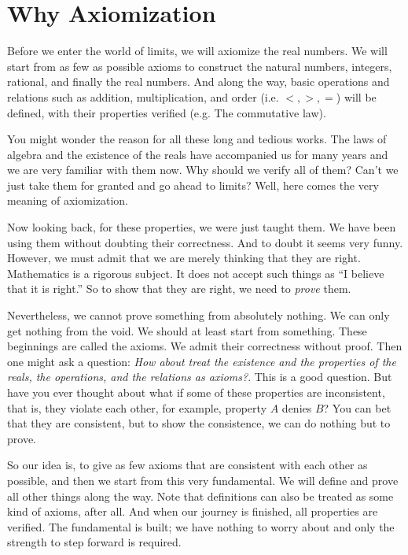 \part*{Why Axiomization}
Before we enter the world of limits, we will axiomize the real numbers. We will start from as few as possible  
axioms to construct the natural numbers, integers, rational, and finally the real numbers. And along the way, 
basic operations and relations such as addition, multiplication, and order (i.e. $<,>,=$) will be defined, with 
their properties verified (e.g. The commutative law).

You might wonder the reason for all these long and tedious works. The laws of algebra and the existence of the 
reals have accompanied us for many years and we are very familiar with them now. Why should we verify all of 
them? Can't we just take them for granted and go ahead to limits? Well, here comes the very meaning of 
axiomization.

Now looking back, for these properties, we were just taught them. We have been using them without doubting their 
correctness. And to doubt it seems very funny. However, we must admit that we are merely thinking that they are 
right. Mathematics is a rigorous subject. It does not accept such things as ``I believe that it is right.'' So to 
show that they are right, we need to \emph{prove} them.

Nevertheless, we cannot prove something from absolutely nothing. We can only get nothing from the void. We should 
at least start from something. These beginnings are called the axioms. We admit their correctness without proof. 
Then one might ask a question: \emph{How about treat the existence and the properties of the reals, the 
operations, and the relations as axioms?}. This is a good question. But have you ever thought about what if some 
of these properties are inconsistent, that is, they violate each other, for example, property $A$ denies $B$? You 
can bet that they are consistent, but to show the consistence, we can do nothing but to prove.

So our idea is, to give as few axioms that are consistent with each other as possible, and then we start from 
this very fundamental. We will define and prove all other things along the way. Note that definitions can also 
be treated as some kind of axioms, after all. And when our journey is finished, all properties are verified. The 
fundamental is built; we have nothing to worry about and only the strength to step forward is required.
